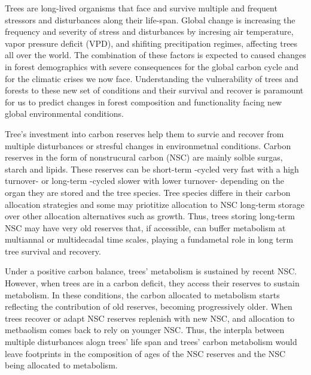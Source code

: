 \documentclass{article}
\begin{document}
Trees are long-lived organisms that face and survive multiple and frequent stressors and disturbances along their life-span. 
Global change is increasing the frequency and severity of stress and disturbances by incresing air temperature, vapor pressure deficit (VPD), and shifiting precitipation regimes, affecting trees all over the world. 
The combination of these factors is expected to caused changes in forest demographics with severe consequences for the global carbon cycle and for the climatic crises we now face. 
Understanding the vulnerability of trees and forests to these new set of conditions and their survival and recover is paramount for us to predict changes in forest composition and functionality facing new global environmental conditions. 

Tree's investment into carbon reserves help them to survie and recover from multiple disturbances or stresful changes in environmetnal conditions.
Carbon reserves in the form of nonstrucural carbon (NSC) are mainly solble surgas, starch and lipids. 
These reserves can be short-term -cycled very fast with a high turnover- or long-term -cycled slower with lower turnover- depending on the organ they are stored and the tree species.
Tree species differe in their carbon allocation strategies and some may priotitize allocation to NSC long-term storage over other allocation alternatives such as growth.
Thus, trees storing long-term NSC may have very old reserves that, if accessible, can buffer metabolism at multiannal or multidecadal time scales, playing a fundametal role in long term tree survival and recovery.  



Under a positive carbon balance, trees' metabolism is sustained by recent NSC. 
However, when trees are in a carbon deficit, they access their reserves to sustain metabolism.
In these conditions, the carbon allocated to metabolism starts reflecting the contribution of old reserves, becoming progressively older. %
When trees recover or adapt NSC reserves replenish with new NSC, and allocation to metbaolism comes back to rely on younger NSC. %
Thus, the interpla between multiple disturbances alogn trees' life span and trees' carbon metabolism would leave footprints in the composition of ages of the NSC reserves and the NSC being allocated to metabolism.
\end{document}
